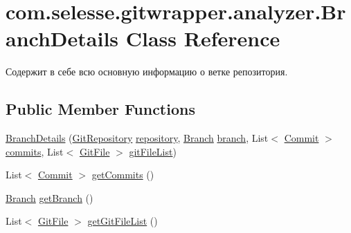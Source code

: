 \hypertarget{classcom_1_1selesse_1_1gitwrapper_1_1analyzer_1_1_branch_details}{}\section{com.\+selesse.\+gitwrapper.\+analyzer.\+Branch\+Details Class Reference}
\label{classcom_1_1selesse_1_1gitwrapper_1_1analyzer_1_1_branch_details}


Содержит в себе всю основную информацию о ветке репозитория.  


\subsection*{Public Member Functions}
\begin{DoxyCompactItemize}
\item 
\hyperlink{classcom_1_1selesse_1_1gitwrapper_1_1analyzer_1_1_branch_details_a22442da2626b243de16247db107f466a}{Branch\+Details} (\hyperlink{classcom_1_1selesse_1_1gitwrapper_1_1myobjects_1_1_git_repository}{Git\+Repository} \hyperlink{classcom_1_1selesse_1_1gitwrapper_1_1analyzer_1_1_branch_details_a94088bafc3cafc9b2060c526e460d5a8}{repository}, \hyperlink{classcom_1_1selesse_1_1gitwrapper_1_1myobjects_1_1_branch}{Branch} \hyperlink{classcom_1_1selesse_1_1gitwrapper_1_1analyzer_1_1_branch_details_a37666451077ef09c1976aaaa20077ed5}{branch}, List$<$ \hyperlink{classcom_1_1selesse_1_1gitwrapper_1_1myobjects_1_1_commit}{Commit} $>$ \hyperlink{classcom_1_1selesse_1_1gitwrapper_1_1analyzer_1_1_branch_details_ac29ec5f3a2db01d208c465070dead2e8}{commits}, List$<$ \hyperlink{classcom_1_1selesse_1_1gitwrapper_1_1myobjects_1_1_git_file}{Git\+File} $>$ \hyperlink{classcom_1_1selesse_1_1gitwrapper_1_1analyzer_1_1_branch_details_a404b15794bd1ddf9d087affb4396e0c7}{git\+File\+List})
\item 
List$<$ \hyperlink{classcom_1_1selesse_1_1gitwrapper_1_1myobjects_1_1_commit}{Commit} $>$ \hyperlink{classcom_1_1selesse_1_1gitwrapper_1_1analyzer_1_1_branch_details_a9c9212dc4f22e882d4f14f73eece3418}{get\+Commits} ()
\item 
\hyperlink{classcom_1_1selesse_1_1gitwrapper_1_1myobjects_1_1_branch}{Branch} \hyperlink{classcom_1_1selesse_1_1gitwrapper_1_1analyzer_1_1_branch_details_a6a21f235463acae1732cef7c12c5f779}{get\+Branch} ()
\item 
List$<$ \hyperlink{classcom_1_1selesse_1_1gitwrapper_1_1myobjects_1_1_git_file}{Git\+File} $>$ \hyperlink{classcom_1_1selesse_1_1gitwrapper_1_1analyzer_1_1_branch_details_a27797089119133ac5c5bfd50306b9fd6}{get\+Git\+File\+List} ()

\end{DoxyCompactItemize}

